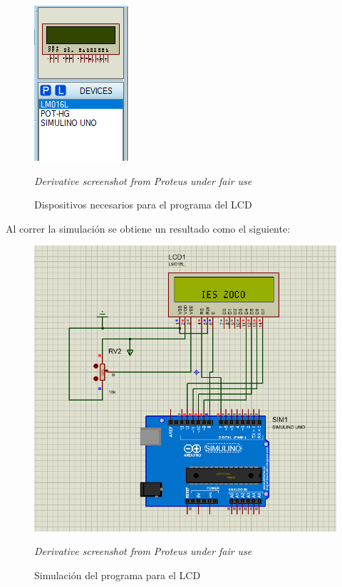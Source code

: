 \documentclass{article}
\begin{document}
    \begin{figure}[H]
        \centering
        \includegraphics[width=0.2\paperwidth]{images/sim-devices}
        \caption{Dispositivos necesarios para el programa del LCD}\footnotesize
        \textit{Derivative screenshot from Proteus under fair use}\label{fig:figure4}
    \end{figure}

    \bigbreak

    Al correr la simulación se obtiene un resultado como el siguiente:

    \begin{figure}[H]
        \centering
        \includegraphics[width=0.6\paperwidth]{images/sim-running}
        \caption{Simulación del programa para el LCD}\footnotesize
        \textit{Derivative screenshot from Proteus under fair use}\label{fig
        :figure3}
    \end{figure}
\end{document}
